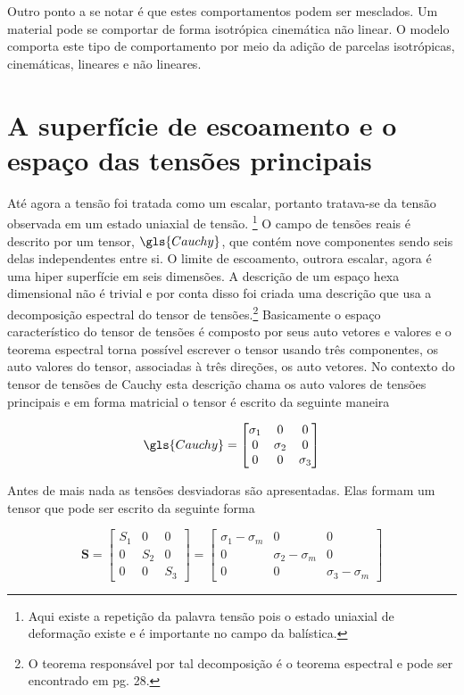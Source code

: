 Outro ponto a se notar é que estes comportamentos podem ser mesclados. Um material pode se comportar de forma isotrópica cinemática não linear. O modelo comporta este tipo de comportamento por meio da adição de parcelas isotrópicas, cinemáticas, lineares e não lineares. \\

\section{A superfície de escoamento e o espaço das tensões principais}

Até agora a tensão foi tratada como um escalar, portanto tratava-se da tensão observada em um estado uniaxial de tensão. \footnote{Aqui existe a repetição da palavra tensão pois o estado uniaxial de deformação existe e é importante no campo da balística.} O campo de tensões reais é descrito por um tensor, $ \gls{Cauchy} $, que contém nove componentes sendo seis delas independentes entre si. O limite de escoamento, outrora escalar, agora é uma hiper superfície em seis dimensões. A descrição de um espaço hexa dimensional não é trivial e por conta disso foi criada uma descrição que usa a decomposição espectral do tensor de tensões.\footnote{O teorema responsável por tal decomposição é o teorema 
espectral e pode ser encontrado em \cite{gurtin_fried_anand_2013} pg. 28. } Basicamente o espaço característico do tensor de tensões é composto por seus auto vetores e valores e o teorema espectral torna possível escrever o tensor usando três componentes, os auto valores do tensor, associadas à três direções, os auto vetores. No contexto do tensor de tensões de Cauchy esta descrição chama os auto valores de tensões principais e em forma matricial o tensor é escrito da seguinte maneira

\begin{equation}
\gls{Cauchy} = 
    \begin{bmatrix}
    \sigma_1 & 0 & 0 \\
    0 & \sigma_2 & 0 \\
    0 & 0 & \sigma_3
    \end{bmatrix}
\end{equation}

Antes de mais nada as tensões desviadoras são apresentadas. Elas formam um tensor que pode ser escrito da seguinte forma

\begin{equation}
\boldsymbol{S} = 
    \begin{bmatrix}
    S_1 & 0 & 0 \\
    0 & S_2 & 0 \\
    0 & 0 & S_3
    \end{bmatrix} = \begin{bmatrix}
    \sigma_1 - \sigma_m & 0 & 0 \\
    0 & \sigma_2 - \sigma_m & 0 \\
    0 & 0 & \sigma_3 - \sigma_m
    \end{bmatrix}
\end{equation}

